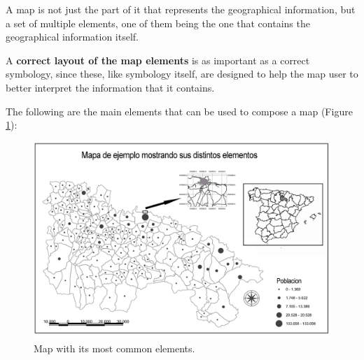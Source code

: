 A map is not just the part of it that represents the geographical information, but a set of multiple elements, one of them being the one that contains the geographical information itself.

A \textbf{correct layout of the map elements} is as important as a correct symbology, since these, like symbology itself, are designed to help the map user to better interpret the information that it contains.

The following are the main elements that can be used to compose a map (Figure \ref{Fig:MapElements}):

\begin{figure}[!hbt]
\centering
\includegraphics[width=\columnwidth]{Visualization/MapElements.png}
\caption{\small Map with its most common elements.}
\label{Fig:MapElements} 
\end{figure}

